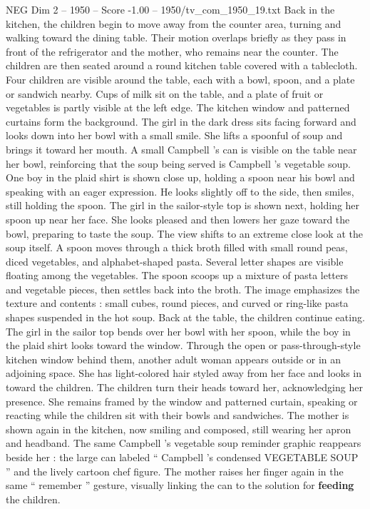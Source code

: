 \begin{textsample}{NEG Dim 2 – 1950 – Score -1.00 – 1950/tv\_com\_1950\_19.txt}
Back in the kitchen, the children begin to move away from the counter area, turning and walking toward the dining table.
Their motion overlaps briefly as they pass in front of the refrigerator and the mother, who remains near the counter.
The children are then seated around a round kitchen table covered with a tablecloth.
Four children are visible around the table, each with a bowl, spoon, and a plate or sandwich nearby.
Cups of milk sit on the table, and a plate of fruit or vegetables is partly visible at the left edge.
The kitchen window and patterned curtains form the background.
The girl in the dark dress sits facing forward and looks down into her bowl with a small smile.
She lifts a spoonful of soup and brings it toward her mouth.
A small Campbell ’s can is visible on the table near her bowl, reinforcing that the soup being served is Campbell ’s vegetable soup.
One boy in the plaid shirt is shown close up, holding a spoon near his bowl and speaking with an eager expression.
He looks slightly off to the side, then smiles, still holding the spoon.
The girl in the sailor-style top is shown next, holding her spoon up near her face.
She looks pleased and then lowers her gaze toward the bowl, preparing to taste the soup.
The view shifts to an extreme close look at the soup itself.
A spoon moves through a thick broth filled with small round peas, diced vegetables, and alphabet-shaped pasta.
Several letter shapes are visible floating among the vegetables.
The spoon scoops up a mixture of pasta letters and vegetable pieces, then settles back into the broth.
The image emphasizes the texture and contents : small cubes, round pieces, and curved or ring-like pasta shapes suspended in the hot soup.
Back at the table, the children continue eating.
The girl in the sailor top bends over her bowl with her spoon, while the boy in the plaid shirt looks toward the window.
Through the open or pass-through-style kitchen window behind them, another adult woman appears outside or in an adjoining space.
She has light-colored hair styled away from her face and looks in toward the children.
The children turn their heads toward her, acknowledging her presence.
She remains framed by the window and patterned curtain, speaking or reacting while the children sit with their bowls and sandwiches.
The mother is shown again in the kitchen, now smiling and composed, still wearing her apron and headband.
The same Campbell ’s vegetable soup reminder graphic reappears beside her : the large can labeled “ Campbell ’s condensed VEGETABLE SOUP ” and the lively cartoon chef figure.
The mother raises her finger again in the same “ remember ” gesture, visually linking the can to the solution for \textbf{feeding} the children.

\end{textsample}
